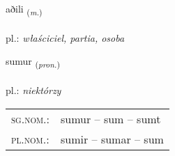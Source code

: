 \documentclass[frontgrid, backgrid]{flacards}\usepackage[]{graphicx}\usepackage[]{xcolor}
\begin{document}
\renewcommand{\blhead}{\vskip5pt {\small\bfseries\footnotesize Nafnorð | Noun }}
\renewcommand{\bcfoot}{\vskip5pt \hspace{2pt}{\small\bfseries\footnotesize 1K}}


{aðili \small{\textsubscript{(\textit{m.})}} \\[1ex] %
\textphonetic{[aːðɪlɪ]} \\
pl.: \emph{właściciel, partia, osoba} \\  [2ex]
\renewcommand*{\arraystretch}{0.8}
}

\renewcommand{\flhead}{\vskip5pt \fboxsep=0pt {\small\bfseries\footnotesize Fornafn | Pronoun}}
\renewcommand{\fcfoot}{\vskip5pt \fboxsep=0pt \hspace{2pt}{\small\bfseries\footnotesize 1K}}

\renewcommand{\blhead}{\vskip5pt {\small\bfseries\footnotesize Fornafn | Pronoun }}
\renewcommand{\bcfoot}{\vskip5pt \hspace{2pt}{\small\bfseries\footnotesize 1K}}


{sumur \small{\textsubscript{(\textit{pron.})}} \\[1ex] %
\textphonetic{[sʏːmʏr]} \\
pl.: \emph{niektórzy} \\  [2ex]
\renewcommand*{\arraystretch}{0.8}
\begin{tabular}{ll}
\textsc{sg.nom.}: & sumur  --  sum -- sumt \\ 
\textsc{pl.nom.}: & sumir -- sumar -- sum
\end{tabular}
}

\renewcommand{\flhead}{\vskip5pt \fboxsep=0pt {\small\bfseries\footnotesize Sagnorð | Verb}}
\renewcommand{\fcfoot}{\vskip5pt \fboxsep=0pt \hspace{2pt}{\small\bfseries\footnotesize 1K}}
\end{document}
